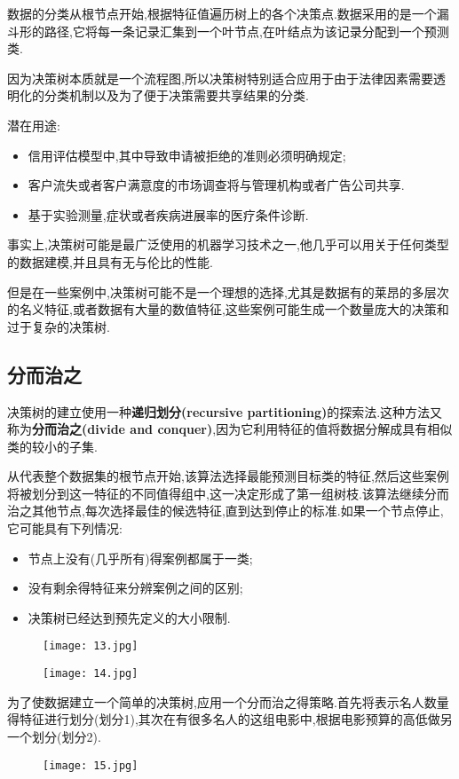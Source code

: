 \documentclass[11pt,a4paper,oneside]{book}
\begin{document}
数据的分类从根节点开始,根据特征值遍历树上的各个决策点.数据采用的是一个漏斗形的路径,它将每一条记录汇集到一个叶节点,在叶结点为该记录分配到一个预测类.

因为决策树本质就是一个流程图,所以决策树特别适合应用于由于法律因素需要透明化的分类机制以及为了便于决策需要共享结果的分类.

潜在用途:
\begin{itemize}
	\item 信用评估模型中,其中导致申请被拒绝的准则必须明确规定;
	\item 客户流失或者客户满意度的市场调查将与管理机构或者广告公司共享.
	\item 基于实验测量,症状或者疾病进展率的医疗条件诊断.
\end{itemize}

事实上,决策树可能是最广泛使用的机器学习技术之一,他几乎可以用关于任何类型的数据建模,并且具有无与伦比的性能.

但是在一些案例中,决策树可能不是一个理想的选择,尤其是数据有的莱昂的多层次的名义特征,或者数据有大量的数值特征,这些案例可能生成一个数量庞大的决策和过于复杂的决策树.

\subsection{分而治之}
决策树的建立使用一种\textbf{递归划分(recursive partitioning)}的探索法.这种方法又称为\textbf{分而治之(divide and conquer)},因为它利用特征的值将数据分解成具有相似类的较小的子集.

从代表整个数据集的根节点开始,该算法选择最能预测目标类的特征,然后这些案例将被划分到这一特征的不同值得组中,这一决定形成了第一组树枝.该算法继续分而治之其他节点,每次选择最佳的候选特征,直到达到停止的标准.如果一个节点停止,它可能具有下列情况:
\begin{itemize}
	\item 节点上没有(几乎所有)得案例都属于一类;
	\item 没有剩余得特征来分辨案例之间的区别;
	\item 决策树已经达到预先定义的大小限制.
\end{itemize}
\begin{figure}[H]
	\centering
	\texttt{[image: 13.jpg]}
\end{figure}
\begin{figure}[H]
	\centering
	\texttt{[image: 14.jpg]}
\end{figure}

为了使数据建立一个简单的决策树,应用一个分而治之得策略.首先将表示名人数量得特征进行划分(划分1),其次在有很多名人的这组电影中,根据电影预算的高低做另一个划分(划分2).
\begin{figure}[H]
	\centering
	\texttt{[image: 15.jpg]}
\end{figure}
\end{document}
